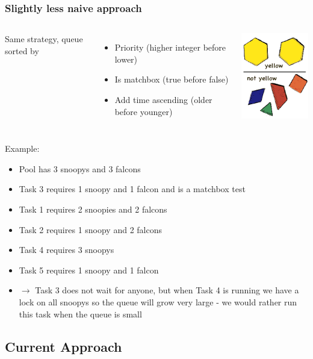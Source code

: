 \documentclass[xcolor=pdftex,dvipsnames,table]{beamer}
\begin{document}
\begin{frame}
\frametitle{Slightly less naive approach}
\begin{columns}[cc]
\column{2.0in}
Same strategy, queue sorted by
\begin{itemize}
  \item Priority (higher integer before lower)
  \item Is matchbox (true before false)
  \item Add time ascending (older before younger)
\end{itemize}
\column{0.5in}
\includegraphics[scale=0.50]{sort.png}
\end{columns}
\end{frame}

\begin{frame}
Example:
\begin{itemize}
  \item Pool has 3 snoopys and 3 falcons
  \item Task 3 requires 1 snoopy and 1 falcon and is a matchbox test
  \item Task 1 requires 2 snoopies and 2 falcons
  \item Task 2 requires 1 snoopy and 2 falcons
  \item Task 4 requires 3 snoopys
  \item Task 5 requires 1 snoopy and 1 falcon
  \item $\rightarrow$ Task 3 does not wait for anyone, but when Task 4
    is running we have a lock on all snoopys so the queue will grow
    very large - we would rather run this task when the queue is small
\end{itemize}
\end{frame}

\subsection{Current Approach}
\end{document}
